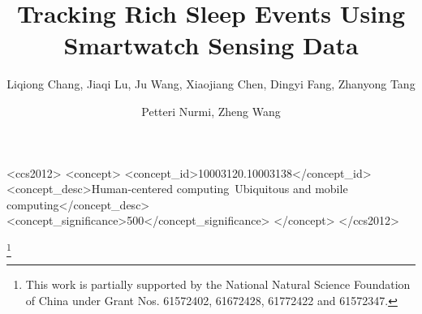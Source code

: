\documentclass[acmlarge]{acmart}
\begin{document}
\title{Tracking Rich Sleep Events Using Smartwatch Sensing Data}

\author{Liqiong Chang, Jiaqi Lu, Ju Wang, Xiaojiang Chen, Dingyi Fang, Zhanyong Tang}
 

\author{Petteri Nurmi, Zheng Wang}
 





\begin{CCSXML}
	<ccs2012>
	<concept>
	<concept_id>10003120.10003138</concept_id>
	<concept_desc>Human-centered computing~Ubiquitous and mobile computing</concept_desc>
	<concept_significance>500</concept_significance>
	</concept>
	</ccs2012>
\end{CCSXML}



\thanks{This work is partially supported by the National Natural Science Foundation of China under Grant Nos. 61572402, 61672428, 61772422 and 61572347.}

\maketitle

\renewcommand{\shortauthors}{L. Chang, J. Lu, J. Wang, X. Chen, D. Fang, Z. Tang, Z. Wang, P. Nurmi}




%
%









\end{document}

